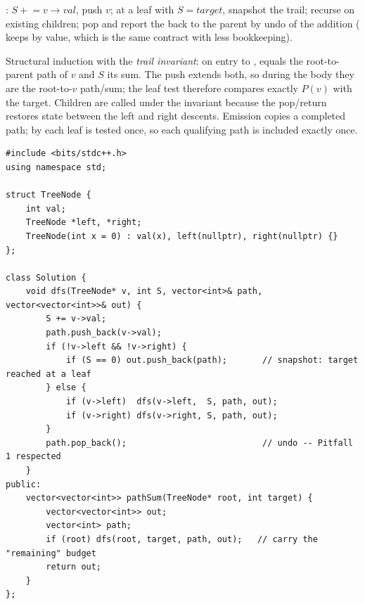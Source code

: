 : $S \mathrel{+}= v\to\mathit{val}$, push $v$; at a leaf with
$S = \mathit{target}$, snapshot the trail; recurse on existing children; pop and
report the  back to the parent by undo of the addition (
keeps  by value, which is the same contract with less bookkeeping).

\begin{proofbox}
Structural induction with the \emph{trail invariant}: on entry to
,  equals the root-to-parent path of $v$ and $S$ its sum.
The push extends both, so during the body they are the root-to-$v$ path/sum; the
leaf test therefore compares exactly $P(v)$ with the target. Children are called
under the invariant because the pop/return restores state between the left and
right descents. Emission copies a completed path; by 
each leaf is tested once, so each qualifying path is included exactly once.
\end{proofbox}

\begin{lstlisting}[caption={Path Sum II (LeetCode 113)}, label={lst:c02-path-sum-ii}]
#include <bits/stdc++.h>
using namespace std;

struct TreeNode {
    int val;
    TreeNode *left, *right;
    TreeNode(int x = 0) : val(x), left(nullptr), right(nullptr) {}
};

class Solution {
    void dfs(TreeNode* v, int S, vector<int>& path, vector<vector<int>>& out) {
        S += v->val;
        path.push_back(v->val);
        if (!v->left && !v->right) {
            if (S == 0) out.push_back(path);       // snapshot: target reached at a leaf
        } else {
            if (v->left)  dfs(v->left,  S, path, out);
            if (v->right) dfs(v->right, S, path, out);
        }
        path.pop_back();                           // undo -- Pitfall 1 respected
    }
public:
    vector<vector<int>> pathSum(TreeNode* root, int target) {
        vector<vector<int>> out;
        vector<int> path;
        if (root) dfs(root, target, path, out);   // carry the "remaining" budget
        return out;
    }
};
\end{lstlisting}


